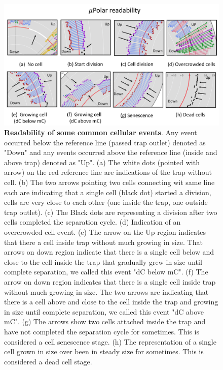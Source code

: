 \documentclass[conference]{IEEEtran}
\begin{document}
\begin{figure}
\centering
\includegraphics[width=\textwidth,height=10 cm]{Patterns/read.pdf}
\caption{\textbf{Readability of some common cellular events}. Any event occurred below the reference line (passed trap outlet) denoted as "Down" and any events occurred above the reference line (inside and above trap) denoted as "Up". (a) The white dots (pointed with arrow) on the red reference line are indications of the trap without cell. (b) The two arrows pointing two cells connecting wit same line each are indicating that a single cell (black dot) started a division, cells are very close to each other (one inside the trap, one outside trap outlet). (c) The Black dots are representing a division after two cells completed the separation cycle. (d) Indication of an overcrowded cell event. (e) The arrow on the Up region indicates that there a cell inside trap without much growing in size. That arrows on down region indicate that there is a single cell below and close to the cell inside the trap that gradually grew in size until complete separation, we called this event "dC below mC". (f) The arrow on down region indicates that there is a single cell inside trap without much growing in size. The two arrows are indicating that there is a cell above and close to the cell inside the trap and growing in size until complete separation, we called this event "dC above mC". (g) The arrows show two cells attached inside the trap and have not completed the separation cycle for sometimes. This is considered a cell senescence stage. (h) The representation of a single cell grown in size over been in steady size for sometimes. This is considered a dead cell stage.}

\label{fig:read}
\end{figure}
\end{document}
